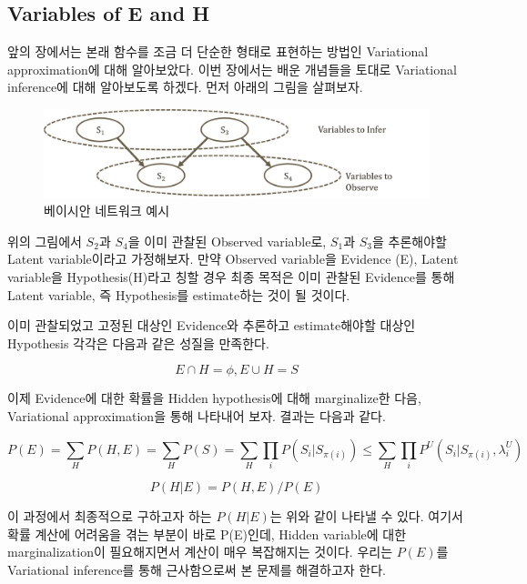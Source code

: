 \documentclass[draft=false]{oblivoir}
\begin{document}
\subsection{Variables of E and H}

앞의 장에서는 본래 함수를 조금 더 단순한 형태로 표현하는 방법인 Variational approximation에 대해 알아보았다. 이번 장에서는 배운 개념들을 토대로 Variational inference에 대해 알아보도록 하겠다. 먼저 아래의 그림을 살펴보자.


\begin{figure}[ht] \centering 
\includegraphics[scale=0.6]{fig11_5.png} 
\caption{베이시안 네트워크 예시}
\label{fig:11-5}
\end{figure}

위의 그림에서 $S_{2}$과 $S_{4}$을 이미 관찰된 Observed variable로,  $S_{1}$과 $S_{3}$을 추론해야할 Latent variable이라고 가정해보자. 만약  Observed variable을 Evidence (E), Latent variable을 Hypothesis(H)라고 칭할 경우 최종 목적은 이미 관찰된 Evidence를 통해 Latent variable, 즉 Hypothesis를 estimate하는 것이 될 것이다.

이미 관찰되었고 고정된 대상인 Evidence와 추론하고 estimate해야할 대상인 Hypothesis 각각은 다음과 같은 성질을 만족한다. 

\begin{equation}
E \cap H =  \phi, E \cup H = S
\label{eq:11-2-10-1}
\end{equation}

이제 Evidence에 대한 확률을 Hidden hypothesis에 대해 marginalize한 다음, Variational approximation을 통해 나타내어 보자. 결과는 다음과 같다. 

\begin{equation}
P(E) = \sum_{H}P(H,E) = \sum_{H}P(S) = \sum_{H}\prod_{i}P(S_{i}|S_{\pi(i)})  \leq  \sum_{H}\prod_{i}P^{U}(S_{i}|S_{\pi(i)},\lambda^{U}_{i})
\label{eq:11-2-11-1}
\end{equation}

\begin{equation}
P(H|E) = P(H,E)/P(E)
\label{eq:11-2-12-1}
\end{equation}

이 과정에서 최종적으로 구하고자 하는 $P(H|E)$는 위와 같이 나타낼 수 있다. 여기서 확률 계산에 어려움을 겪는 부분이 바로 P(E)인데, Hidden variable에 대한 marginalization이 필요해지면서 계산이 매우 복잡해지는 것이다. 우리는 $P(E)$를 Variational inference를 통해 근사함으로써 본 문제를 해결하고자 한다. 
\end{document}
